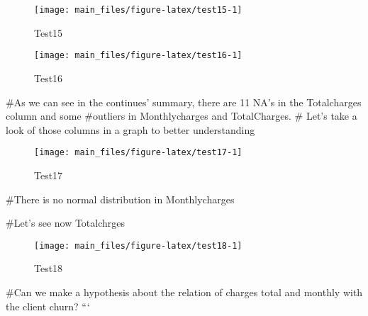 \begin{Schunk}
\begin{figure}[H]

{\centering \texttt{[image: main\_files/figure-latex/test15-1]} 

}

\caption[Test15 ]{Test15 }\label{fig:test15}
\end{figure}
\end{Schunk}

\begin{Schunk}
\begin{figure}[H]

{\centering \texttt{[image: main\_files/figure-latex/test16-1]} 

}

\caption[Test16 ]{Test16 }\label{fig:test16}
\end{figure}
\end{Schunk}

\#As we can see in the continues' summary, there are 11 NA's in the
Totalcharges column and some \#outliers in Monthlycharges and
TotalCharges. \# Let's take a look of those columns in a graph to better
understanding

\begin{Schunk}
\begin{figure}[H]

{\centering \texttt{[image: main\_files/figure-latex/test17-1]} 

}

\caption[Test17 ]{Test17 }\label{fig:test17}
\end{figure}
\end{Schunk}

\#There is no normal distribution in Monthlycharges

\#Let's see now Totalchrges

\begin{Schunk}
\begin{figure}[H]

{\centering \texttt{[image: main\_files/figure-latex/test18-1]} 

}

\caption[Test18 ]{Test18 }\label{fig:test18}
\end{figure}
\end{Schunk}

\#Can we make a hypothesis about the relation of charges total and
monthly with the client churn? ```

